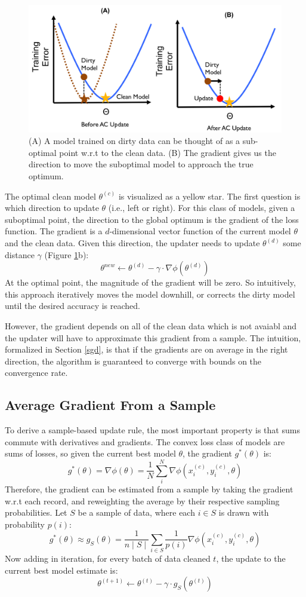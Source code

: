\begin{figure}[ht!]
\centering
 \includegraphics[width=0.7\columnwidth]{figs/update-arch2.png}
 \caption{(A) A model trained on dirty data can be thought of as a sub-optimal point w.r.t to the clean data. (B) The gradient gives us the direction to move the suboptimal model to approach the true optimum. \label{update-arch2}}
\end{figure}

The optimal clean model $\theta^{(c)}$ is visualized as a yellow star.
The first question is which direction to update $\theta$ (i.e., left or right).
For this class of models, given a suboptimal point, the direction to 
the global optimum is the gradient of the loss function.
The gradient is a $d$-dimensional vector function of the current model $\theta$ and the clean data.
Given this direction, the updater needs to update $\theta^{(d)}$ some distance $\gamma$ (Figure \ref{update-arch2}b):
\[
\theta^{new} \leftarrow \theta^{(d)} - \gamma \cdot \nabla\phi(\theta^{(d)})
\]
At the optimal point, the magnitude of the gradient will be zero.
So intuitively, this approach iteratively moves the model downhill, or corrects the dirty model until the desired accuracy is reached.

However, the gradient depends on all of the clean data which is not avaiabl and the updater will have to approximate this gradient from a sample.
The intuition, formalized in Section \ref{sgd}, is that if the gradients are on average in the right direction, the algorithm is guaranteed to converge with bounds on the convergence rate.

\subsection{Average Gradient From a Sample}
To derive a sample-based update rule, the most important property is that sums commute with derivatives and gradients.
The convex loss class of models are sums of losses, so given the current best model $\theta$, the gradient $g^*(\theta)$ is:
\[
g^*(\theta) = \nabla\phi(\theta) = \frac{1}{N} \sum_i^N \nabla\phi(x_i^{(c)},y_i^{(c)},\theta)
\]
Therefore, the gradient can be estimated from a sample by taking the gradient w.r.t each record, and reweighting the average by their respective sampling probabilities.
Let $S$ be a sample of data, where each $i \in S$ is drawn with probability $p(i)$:
\[
g^*(\theta) \approx g_{S}(\theta) = \frac{1}{n\mid S \mid} \sum_{i \in S}\frac{1}{p(i)}\nabla\phi(x_i^{(c)},y_i^{(c)},\theta)
\]
Now adding in iteration, for every batch of data cleaned $t$, the update to the current best model estimate is:
\[
\theta^{(t+1)} \leftarrow \theta^{(t)} - \gamma \cdot g_{S}(\theta^{(t)})
\]

